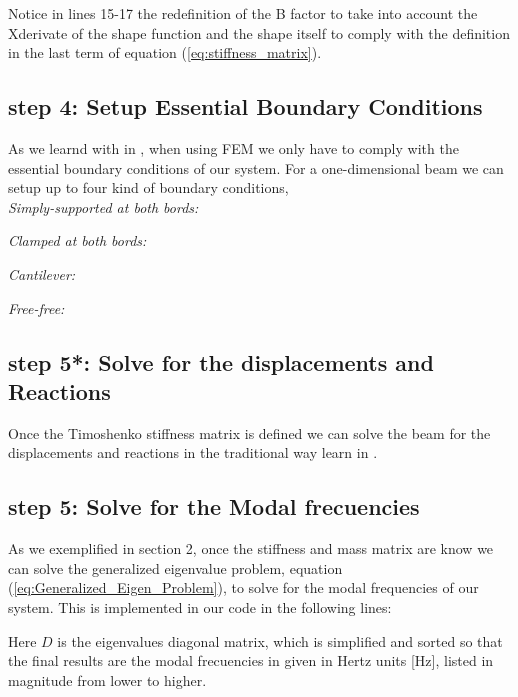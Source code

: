 \documentclass[10pt,twoside,a4paper]{article}
\begin{document}


Notice in lines 15-17 the redefinition of the B factor to take into account the Xderivate of the shape function and the shape itself to comply with the definition in the last term of equation (\ref{eq:stiffness_matrix}). 

\subsection{step 4: Setup Essential Boundary Conditions}
As we learnd with in \cite{Chen2013}, when using FEM we only have to comply with the essential boundary conditions of our system. For a one-dimensional beam we can setup up to four kind of boundary conditions, \\

\emph{Simply-supported at both bords:} 


\emph{Clamped at both bords:} 


\emph{Cantilever:} 


\emph{Free-free:} 


\subsection{step 5*: Solve for the displacements and Reactions}
Once the Timoshenko stiffness matrix is defined we can solve the beam for the displacements and reactions in the traditional way learn in \cite{Chen2013}.



\subsection{step 5: Solve for the Modal frecuencies}
As we exemplified in section 2, once the stiffness and mass matrix are know we can solve the generalized eigenvalue problem, equation (\ref{eq:Generalized_Eigen_Problem}), to solve for the modal frequencies of our system. This is implemented in our code in the following lines:



Here $D$ is the eigenvalues diagonal matrix, which is simplified and sorted so that the final results are the modal frecuencies in given in Hertz units [Hz], listed in magnitude from lower to higher.
\end{document}
